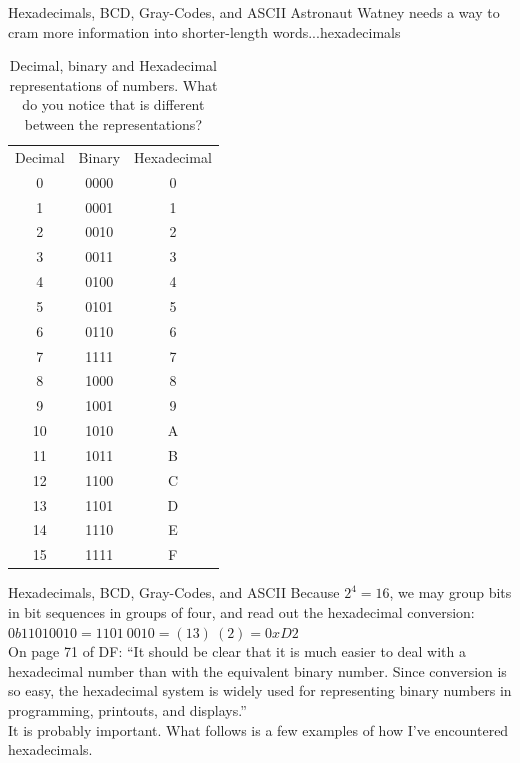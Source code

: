 \documentclass{beamer}
\begin{document}
\begin{frame}{Hexadecimals, BCD, Gray-Codes, and ASCII}
\small
Astronaut Watney needs a way to cram more information into shorter-length words...hexadecimals
\tiny
\begin{table}
\centering
\begin{tabular}{c c c}
Decimal & Binary & Hexadecimal \\ 
0 & 0000 & 0 \\
1 & 0001 & 1 \\
2 & 0010 & 2 \\
3 & 0011 & 3 \\
4 & 0100 & 4 \\
5 & 0101 & 5 \\
6 & 0110 & 6 \\
7 & 1111 & 7 \\
8 & 1000 & 8 \\
9 & 1001 & 9 \\
10 & 1010 & A \\
11 & 1011 & B \\
12 & 1100 & C \\
13 & 1101 & D \\
14 & 1110 & E \\
15 & 1111 & F 
\end{tabular}
\caption{\small \label{tab:hex1} Decimal, binary and Hexadecimal representations of numbers.  What do you notice that is different between the representations?}
\end{table}
\end{frame}

\begin{frame}{Hexadecimals, BCD, Gray-Codes, and ASCII}
\small Because $2^4 = 16$, we may group bits in bit sequences in groups of four, and read out the hexadecimal conversion: \\ \vspace{0.5cm}
$0b11010010 = 1101~0010 = (13)~(2) = 0xD2$ \\ \vspace{0.5cm}
On page 71 of DF: ``It should be clear that it is much easier to deal with a hexadecimal number than with the equivalent binary number.  Since conversion is so easy, the hexadecimal system is widely used for representing binary numbers in programming, printouts, and displays.'' \\ \vspace{0.5cm}
\alert{It is probably important.}  What follows is a few examples of how I've encountered hexadecimals.
\end{frame}
\end{document}
